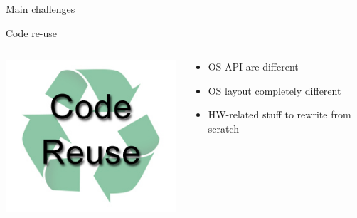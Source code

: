 \documentclass{beamer}
\begin{document}
\begin{frame}{Main challenges}
\begin{block}{Code re-use}
		  \begin{columns}[onlytextwidth]
		  	\begin{column}{0.3\textwidth}
			      	\includegraphics[width=\textwidth]{code-reuse.jpg}
			\end{column}

			\begin{column}{0.7\textwidth}
				\begin{itemize}
					\item OS API are different
					\item OS layout completely different
					\item HW-related stuff to rewrite from scratch
				\end{itemize}
			\end{column}
		\end{columns}
	  \end{block}

  \end{frame}
\end{document}
